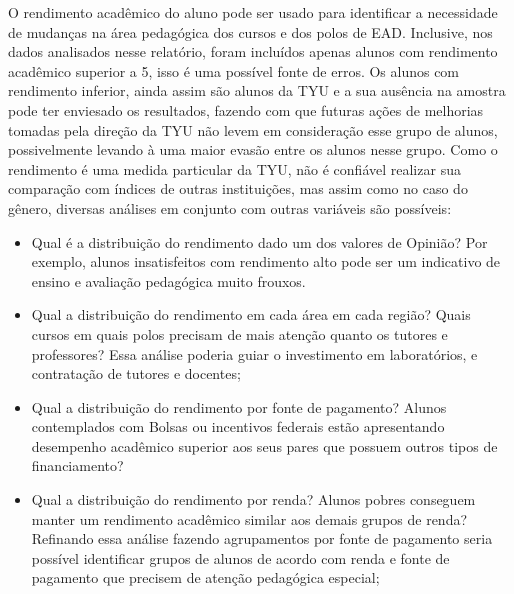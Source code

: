 \documentclass[10pt,a4paper,oneside]{article}
\begin{document}
O rendimento acadêmico do aluno pode ser usado para identificar a necessidade de mudanças na área pedagógica dos cursos e dos polos de EAD. Inclusive, nos dados analisados nesse relatório, foram incluídos apenas alunos com rendimento acadêmico superior a 5, isso é uma possível fonte de erros. Os alunos com rendimento inferior, ainda assim são alunos da TYU e a sua ausência na amostra pode ter enviesado os resultados, fazendo com que futuras ações de melhorias tomadas pela direção da TYU não levem em consideração esse grupo de alunos, possivelmente levando à uma maior evasão entre os alunos nesse grupo. Como o rendimento é uma medida particular da TYU, não é confiável realizar sua comparação com índices de outras instituições, mas assim como no caso do gênero, diversas análises em conjunto com outras variáveis são possíveis:
\begin{itemize}
	\item Qual é a distribuição do rendimento dado um dos valores de Opinião? Por exemplo, alunos insatisfeitos com rendimento alto pode ser um indicativo de ensino e avaliação pedagógica muito frouxos.
	\item Qual a distribuição do rendimento em cada área em cada região? Quais cursos em quais polos precisam de mais atenção quanto os tutores e professores? Essa análise poderia guiar o investimento em laboratórios, e contratação de tutores e docentes;
	\item Qual a distribuição do rendimento por fonte de pagamento? Alunos contemplados com Bolsas ou incentivos federais estão apresentando desempenho acadêmico superior aos seus pares que possuem outros tipos de financiamento? 
	\item Qual a distribuição do rendimento por renda? Alunos pobres conseguem manter um rendimento acadêmico similar aos demais grupos de renda? Refinando essa análise fazendo agrupamentos por fonte de pagamento seria possível identificar grupos de alunos de acordo com renda e fonte de pagamento que precisem de atenção pedagógica especial;
\end{itemize}
\end{document}
